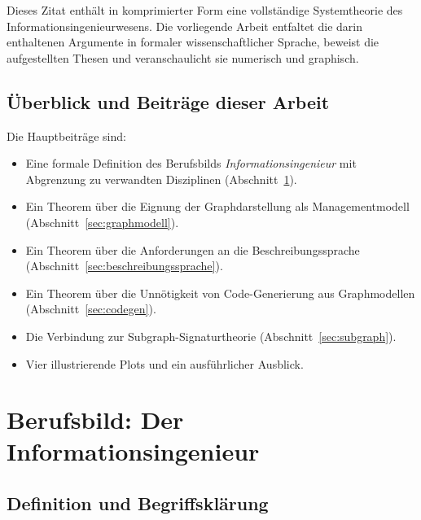 ﻿\documentclass[a4paper,12pt]{article}
\theoremstyle{definition}
\begin{document}
\noindent
Dieses Zitat enthält in komprimierter Form eine vollständige Systemtheorie des
Informationsingenieurwesens. Die vorliegende Arbeit entfaltet die darin enthaltenen
Argumente in formaler wissenschaftlicher Sprache, beweist die aufgestellten Thesen und
veranschaulicht sie numerisch und graphisch.

\subsection{Überblick und Beiträge dieser Arbeit}

Die Hauptbeiträge sind:

\begin{itemize}
  \item Eine formale Definition des Berufsbilds \emph{Informationsingenieur} mit
        Abgrenzung zu verwandten Disziplinen (Abschnitt~\ref{sec:berufsbild}).
  \item Ein Theorem über die Eignung der Graphdarstellung als Managementmodell
        (Abschnitt~\ref{sec:graphmodell}).
  \item Ein Theorem über die Anforderungen an die Beschreibungssprache
        (Abschnitt~\ref{sec:beschreibungssprache}).
  \item Ein Theorem über die Unnötigkeit von Code-Generierung aus Graphmodellen
        (Abschnitt~\ref{sec:codegen}).
  \item Die Verbindung zur Subgraph-Signaturtheorie
        (Abschnitt~\ref{sec:subgraph}).
  \item Vier illustrierende Plots und ein ausführlicher Ausblick.
\end{itemize}

\section{Berufsbild: Der Informationsingenieur}
\label{sec:berufsbild}

\subsection{Definition und Begriffsklärung}
\end{document}
